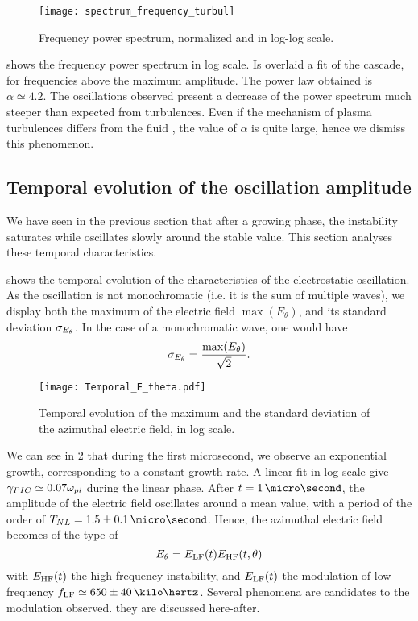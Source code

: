   \begin{figure}[hbt]
    \centering
    \texttt{[image: spectrum\_frequency\_turbul]}
    \caption{Frequency power spectrum, normalized and in log-log scale. }
    \label{fig-turbul}
  \end{figure}
  
   shows the frequency power spectrum in log scale.
  Is overlaid a fit of the cascade, for frequencies above the maximum amplitude.
  The power law obtained is $\alpha \simeq 4.2$.
  The oscillations observed present a decrease of the power spectrum much steeper than expected from turbulences.
  Even if the mechanism of plasma turbulences differs from the fluid \citep{tsytovich1972}, the value of $\alpha$ is quite large, hence we dismiss this phenomenon.
  
  \subsection{Temporal evolution of the oscillation amplitude} \label{subsec-temp}
  We have seen in the previous section that after a growing phase, the instability saturates while oscillates slowly around the stable value.
  This section analyses these temporal characteristics.
  
   shows the temporal evolution of the characteristics of the electrostatic oscillation.
  As the oscillation is not monochromatic (i.e. it is the sum of multiple waves), we display both the maximum of the electric field $\max(E_{\theta})$, and its standard deviation $\sigma_{E_{\theta}}$.
  In the case of a monochromatic wave, one would have 
  \[ \sigma_{E_{\theta}} = \frac{\max(E_{\theta})}{\sqrt{2}}.  \]
  
  \begin{figure}[hbt]
    \centering
    \texttt{[image: Temporal\_E\_theta.pdf]}
    \caption{Temporal evolution of the maximum and the standard deviation of the azimuthal electric field, in log scale.}
    \label{fig-Ezstd_time}
  \end{figure}
  
  We can see in \cref{fig-Ezstd_time} that during the first microsecond, we observe an exponential growth, corresponding to a constant growth rate.
  A linear fit in log scale give $\gamma_{PIC} \simeq 0.07 \omega_{pi}$ during the linear phase.
  After $t=1\,\micro\second$, the amplitude of the electric field oscillates around a mean value, with a period of the order of $T_{NL}=1.5 \pm 0.1 \,\micro\second$.
  Hence, the azimuthal electric field becomes of the type of
  \[  E_{\theta} = E_{\rm LF}(t) E_{\rm HF}(t, {\theta}) \]
  with $E_{\rm HF}(t) $ the high frequency instability, and $E_{\rm LF}(t)$ the modulation of low frequency $f_{\rm LF} \simeq  650 \pm 40 \,\kilo\hertz$.
  Several phenomena are candidates to the modulation observed.
  they are discussed here-after.
  
